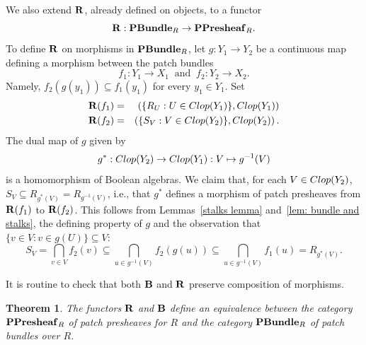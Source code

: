 \documentclass[11pt]{amsart}
\newtheorem{theorem}{Theorem}[section]
\theoremstyle{definition}
\begin{document}
We also extend ${\bf R}$, already defined on objects, to a functor $${\bf R}: {\bf PBundle}_R  \rightarrow {\bf PPresheaf}_R.$$
To define ${\bf R}$ on morphisms in ${\bf PBundle}_R$, let $g:Y_1 \rightarrow Y_2$ be a continuous map defining a morphism between the patch bundles $$
f_1:Y_1  \rightarrow X_1 \: {\mbox{ and }} \: f_2 : Y_2  \rightarrow X_2.
$$
Namely, $f_2(g(y_1))\subseteq f_1(y_1)$ for every $y_1\in Y_1$. Set 
\begin{eqnarray*}
{\bf R}(f_1) & = & \left(
\{R_U:U \in {\rm Clop}(Y_1)\},  {\rm Clop}(Y_1)\right) \\ {\bf R}(f_2) & = & \left(
\{S_V:V \in {\rm Clop}(Y_2)\},  {\rm Clop}(Y_2)\right).
\end{eqnarray*}
The dual map of $g$ given by
$$g^*:{\rm Clop}(Y_2) \rightarrow {\rm Clop}(Y_1):V \mapsto g^{-1}(V)$$ is a homomorphism of Boolean algebras. We claim that, for each $V \in {\rm Clop}(Y_2)$, $S_V\subseteq R_{g^*(V)}=R_{g^{-1}(V)}$, i.e., that $g^*$ defines a morphism of patch presheaves from ${\bf R}(f_1)$ to ${\bf R}(f_2)$. This follows from Lemmas~\ref{stalks lemma} and~\ref{lem: bundle and stalks}, the defining property of $g$ and the observation that $\{v\in V: v\in g(U)\}\subseteq V$:
\[ S_V=\bigcap_{v\in V}f_2(v)\subseteq \bigcap_{u\in g^{-1}(V)} f_2(g(u))\subseteq \bigcap_{u\in g^{-1}(V)} f_1(u)=R_{g^*(V)}.\]

It is routine to check that both ${\bf B}$ and ${\bf R}$ preserve composition of morphisms.


\begin{theorem}\label{thm: cat equiv} The functors ${\bf R}$ and ${\bf B}$ define an equivalence between the
category ${\bf PPresheaf}_R$ of patch presheaves for $R$ and the category ${\bf PBundle}_R$ of patch bundles over $R$.  
\end{theorem} 
\end{document}
